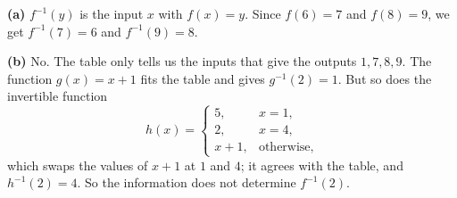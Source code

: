 \textbf{(a)} $f^{-1}(y)$ is the input $x$ with $f(x)=y$. Since $f(6)=7$ and $f(8)=9$, we get $f^{-1}(7)=\boxed6$ and $f^{-1}(9)=\boxed8$.

\textbf{(b)} No. The table only tells us the inputs that give the outputs $1,7,8,9$. The function $g(x)=x+1$ fits the table and gives $g^{-1}(2)=1$. But so does the invertible function
\[h(x)=\begin{cases}5,&x=1,\\2,&x=4,\\x+1,&\text{otherwise},\end{cases}\]
which swaps the values of $x+1$ at $1$ and $4$; it agrees with the table, and $h^{-1}(2)=4$. So the information does not determine $f^{-1}(2)$.
